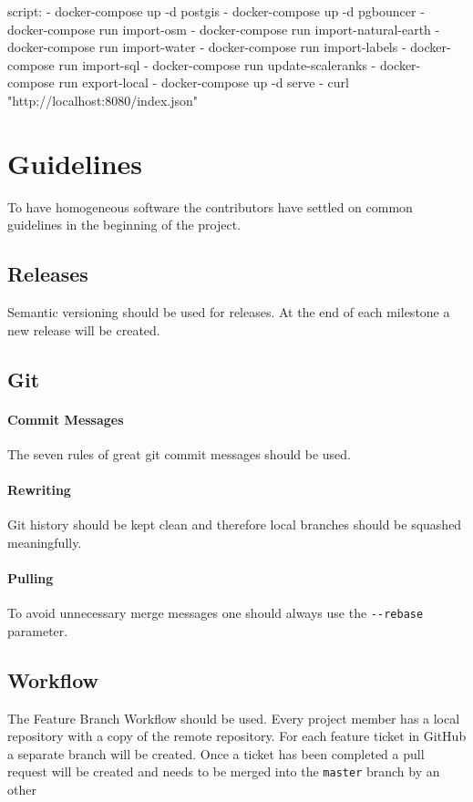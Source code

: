 \begin{yamlcode}
script:
  - docker-compose up -d postgis
  - docker-compose up -d pgbouncer
  - docker-compose run import-osm
  - docker-compose run import-natural-earth
  - docker-compose run import-water
  - docker-compose run import-labels
  - docker-compose run import-sql
  - docker-compose run update-scaleranks
  - docker-compose run export-local
  - docker-compose up -d serve
  - curl "http://localhost:8080/index.json"
\end{yamlcode}

\section{Guidelines}\label{guidelines}
To have homogeneous software the contributors have settled on common guidelines in the beginning of the project.

\subsection{Releases}
Semantic versioning \cite{pm_7_preston-werner_2015} should be used for releases.
At the end of each milestone a new release will be created.
\newpage

\subsection{Git}\label{git}
\paragraph{Commit Messages}
The seven rules of great git commit
messages\cite{pm_8_chris.beams.io_2015} should be used.

\paragraph{Rewriting}
Git history should be kept clean and therefore local branches should be
squashed meaningfully.

\paragraph{Pulling}
To avoid unnecessary merge messages one should always use the
\texttt{-\/-rebase} parameter.

\subsection{Workflow}\label{git-workflow}
The Feature Branch Workflow\cite{pm_9_atlassian_git_tutorial_2015} should be used. Every project member has a local repository with a copy of the remote
repository. For each feature ticket in GitHub a separate branch
will be created. Once a ticket has been completed a pull request will be
created and needs to be merged into the \texttt{master} branch by an other 

